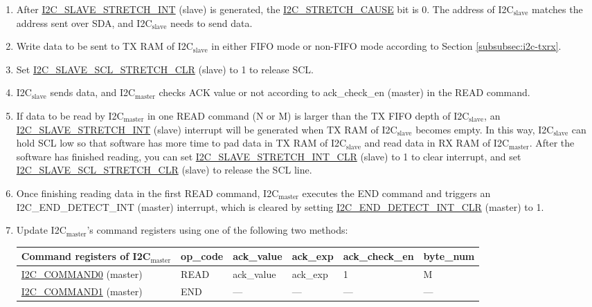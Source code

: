 \documentclass[main\_\_EN.tex]{subfiles}
\begin{document}
\begin{enumerate}
\item After \hyperref[int:i2c-slave-stretch]{I2C\_SLAVE\_STRETCH\_INT} (slave) is generated, the \hyperref[fielddesc:I2CSTRETCHCAUSE]{I2C\_STRETCH\_CAUSE} bit is 0. The address of I2C$_\text{slave}$ matches the address sent over SDA, and I2C$_\text{slave}$ needs to send data.
\item Write data to be sent to TX RAM of I2C$_\text{slave}$ in either FIFO mode or non-FIFO mode according to Section \ref{subsubsec:i2c-txrx}.
\item Set \hyperref[fielddesc:I2CSLAVESCLSTRETCHCLR]{I2C\_SLAVE\_SCL\_STRETCH\_CLR} (slave) to 1 to release SCL.
\item I2C$_\text{slave}$ sends data, and I2C$_\text{master}$ checks ACK value or not according to ack\_check\_en (master) in the READ command.
\item If data to be read by I2C$_\text{master}$ in one READ command (N or M) is larger than the TX FIFO depth of I2C$_\text{slave}$, an \hyperref[int:i2c-slave-stretch]{I2C\_SLAVE\_STRETCH\_INT} (slave) interrupt will be generated when TX RAM of I2C$_\text{slave}$ becomes empty. In this way, I2C$_\text{slave}$ can hold SCL low so that software has more time to pad data in TX RAM of I2C$_\text{slave}$ and read data in RX RAM of I2C$_\text{master}$. After the software has finished reading, you can set \hyperref[fielddesc:I2CSLAVESTRETCHINTCLR]{I2C\_SLAVE\_STRETCH\_INT\_CLR} (slave) to 1 to clear interrupt, and set \hyperref[fielddesc:I2CSLAVESCLSTRETCHCLR]{I2C\_SLAVE\_SCL\_STRETCH\_CLR} (slave) to release the SCL line.
\item Once finishing reading data in the first READ command, I2C$_\text{master}$ executes the END command and triggers an I2C\_END\_DETECT\_INT (master) interrupt, which is cleared by setting \hyperref[fielddesc:I2CENDDETECTINTCLR]{I2C\_END\_DETECT\_INT\_CLR} (master) to 1.

\item Update I2C$_\text{master}$'s command registers using one of the following two methods:

\begin{longtable}{ | p{5cm} | p{1.5cm} | p{1.5cm} | p{1.5cm} |p{2.5cm} | p{1.5cm} |}
\hline\rowcolor{lightgray}
Command registers of I2C$_\text{master}$& op\_code & ack\_value&ack\_exp&ack\_check\_en&byte\_num  \\ \hline
\hyperref[fielddesc:I2CCOMMAND0]{I2C\_COMMAND0} (master)& READ& ack\_value&ack\_exp&1&M  \\ \hline
\hyperref[fielddesc:I2CCOMMAND1]{I2C\_COMMAND1} (master)& END& ---&---&---&---  \\ \hline
\end{longtable}


\end{enumerate}
\end{document}
